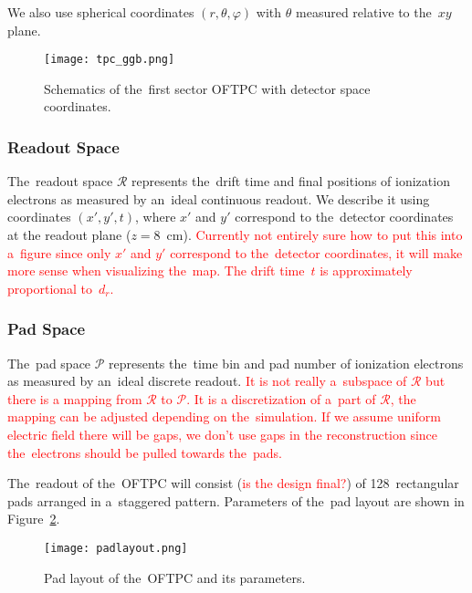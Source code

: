 				We also use spherical coordinates $(r,\theta,\varphi)$ with $\theta$ measured relative to the~$xy$ plane.
				
				\begin{figure}
					\centering
					\texttt{[image: tpc\_ggb.png]}
					\caption{Schematics of the~first sector \ac{OFTPC} with detector space coordinates.}
					\label{fig:oftpc}
				\end{figure}
			
			\subsubsection{Readout Space}
				The~readout space $\mathcal{R}$ represents the~drift time and final positions of ionization electrons as measured by an~ideal continuous readout. We describe it using coordinates $(x',y',t)$, where $x'$ and $y'$ correspond to the~detector coordinates at the readout plane ($z = 8$~cm). \textcolor{red}{Currently not entirely sure how to put this into a~figure since only $x'$ and $y'$ correspond to the~detector coordinates, it will make more sense when visualizing the~map. The drift time~$t$ is approximately proportional to~$d_r$.}
			
			\subsubsection{Pad Space}
				The~pad space $\mathcal{P}$ represents the~time bin and pad number of ionization electrons as measured by an~ideal discrete readout. \textcolor{red}{It is not really a~subspace of $\mathcal{R}$ but there is a mapping from $\mathcal{R}$ to $\mathcal{P}$. It is a discretization of a~part of $\mathcal{R}$, the mapping can be adjusted depending on the~simulation. If we assume uniform electric field there will be gaps, we don't use gaps in the reconstruction since the~electrons should be pulled towards the~pads.}
				
				The~readout of the~\ac{OFTPC} will consist (\textcolor{red}{is the design final?}) of 128~rectangular pads arranged in a~staggered pattern. Parameters of the~pad layout are shown in Figure~\ref{fig:padlayout}.
			
				\begin{figure}[H]
					\centering
					\texttt{[image: padlayout.png]}
					\caption{Pad layout of the~\ac{OFTPC} and its parameters.}
					\label{fig:padlayout}
				\end{figure}
		
